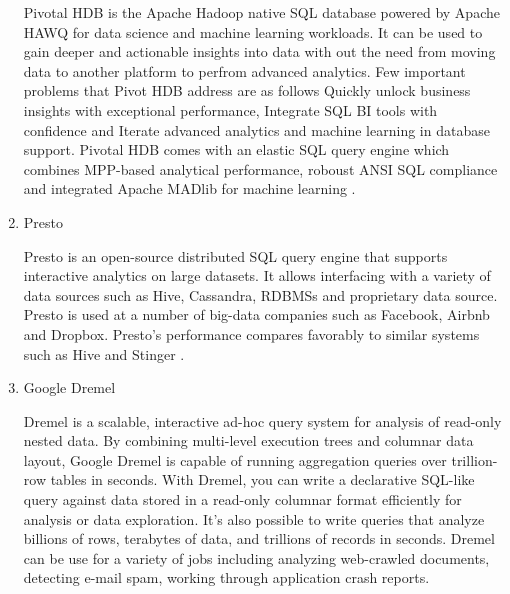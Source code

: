 \begin{enumerate}
Pivotal HDB is the Apache Hadoop native SQL database powered by
Apache HAWQ \label{\detokenize{i524/technologies:id231}}{\hyperref[\detokenize{i524/technologies:www-apache-hqwq}]{\sphinxcrossref{{[}194{]}}}} for data science and machine
learning workloads. It can be used to gain deeper and actionable
insights into data with out the need from moving data to another
platform to perfrom advanced analytics. Few important problems
that Pivot HDB address are as follows Quickly unlock business
insights with exceptional performance, Integrate SQL BI tools
with confidence and Iterate advanced analytics and machine
learning in database support. Pivotal HDB comes with an elastic
SQL query engine which combines MPP-based analytical performance,
roboust ANSI SQL compliance and integrated Apache MADlib for
machine learning \label{\detokenize{i524/technologies:id232}}{\hyperref[\detokenize{i524/technologies:www-pivotalhdb}]{\sphinxcrossref{{[}195{]}}}}.

\item {} 
Presto

Presto \label{\detokenize{i524/technologies:id233}}{\hyperref[\detokenize{i524/technologies:www-presto}]{\sphinxcrossref{{[}196{]}}}} is an open-source distributed SQL query
engine that supports interactive analytics on large datasets. It
allows interfacing with a variety of data sources such as Hive,
Cassandra, RDBMSs and proprietary data source. Presto is used at a
number of big-data companies such as Facebook, Airbnb and
Dropbox. Presto's performance compares favorably to similar systems
such as Hive and Stinger \label{\detokenize{i524/technologies:id234}}{\hyperref[\detokenize{i524/technologies:presto-paper-2014}]{\sphinxcrossref{{[}197{]}}}}.

\item {} 
Google Dremel

Dremel is a scalable, interactive ad-hoc query system for
analysis of read-only nested data. By combining multi-level
execution trees and columnar data layout, Google Dremel is
capable of running aggregation queries over trillion-row tables
in seconds. \label{\detokenize{i524/technologies:id235}}{\hyperref[\detokenize{i524/technologies:paper-dremel}]{\sphinxcrossref{{[}198{]}}}} With Dremel, you can write a
declarative SQL-like query against data stored in a read-only
columnar format efficiently for analysis or data exploration.
It's also possible to write queries that analyze billions of
rows, terabytes of data, and trillions of records in
seconds. Dremel can be use for a variety of jobs including
analyzing web-crawled documents, detecting e-mail spam, working
through application crash reports.


\end{enumerate}
